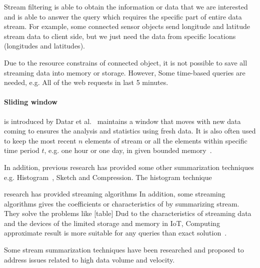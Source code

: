 Stream filtering is able to obtain the information or data that we are
interested and is able to answer the query which requires the specific part of
entire data stream. For example, some connected sensor objects send longitude
and latitude stream data to client side, but we just need the data from specific
locations (longitudes and latitudes).


Due to the resource constrains of connected object, it is not possible to save
all streaming data into memory or storage. However, Some time-based queries are
needed, e.g. All of the web requests in last 5 minutes.

\paragraph{Sliding window} is introduced by Datar et
al.~\cite{datar2002maintaining} maintains a window that moves with new data
coming to ensures the analysis and statistics using fresh data. It is also often
used to keep the most recent $n$ elements of stream or all the elements within
specific time period $t$, e.g. one hour or one day, in given bounded
memory~\cite{leskovec2014mining}. 


In addition, previous research has provided some other summarization techniques
e.g. Histogram~\cite{hesabi2015data, poosala1999approximate}, Sketch and
Compression.
The histogram technique 

research has provided streaming algorithms
In addition, some streaming algorithms gives the coefficients or characteristics of by summarizing stream. They solve the problems like [table]
Dud to the characteristics of streaming data and the devices of the limited storage and memory in IoT, Computing approximate result is more suitable for any queries than exact solution~\cite{kejariwal2015real}. 






% 
%


Some
stream summarization techniques have been researched and proposed to address
issues related to high data volume and velocity. 

